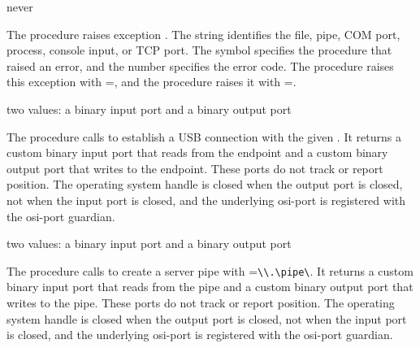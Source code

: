 \begin{procedure}
\end{procedure}
\returns{} never

The  procedure raises exception .  The string 
identifies the file, pipe, COM port, process, console input, or TCP
port.  The symbol  specifies the procedure that raised an
error, and the number  specifies the error code.  The
 procedure raises this exception with
=, and the  procedure
raises it with =.

\begin{procedure}
\end{procedure}
\returns{} two values: a binary input port and a binary output port

The  procedure calls  to
establish a USB connection with the given . It
returns a custom binary input port that reads from the
 endpoint and a custom binary output port that
writes to the  endpoint. These ports do not track
or report position. The operating system handle is closed when the
output port is closed, not when the input port is closed, and the
underlying osi-port is registered with the osi-port
guardian.

\begin{procedure}
\end{procedure}
\returns{} two values: a binary input port and a binary output port

The  procedure calls
 to
create a server pipe with
=\verb|\\.\pipe\|. It returns a custom binary
input port that reads from the pipe and a custom binary output port
that writes to the pipe. These ports do not track or report
position. The operating system handle is closed when the output port
is closed, not when the input port is closed, and the underlying
osi-port is registered with the osi-port guardian.

